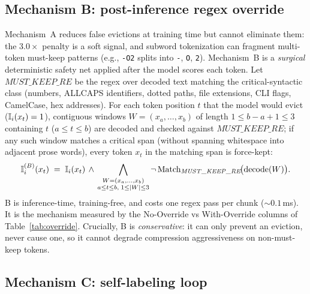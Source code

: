\subsection{Mechanism B: post-inference regex override}
\label{sec:override}

Mechanism~A reduces false evictions at training time but cannot eliminate
them: the $3.0\times$ penalty is a soft signal, and subword tokenization can
fragment multi-token must-keep patterns (e.g., \texttt{-O2} splits into
\texttt{-}, \texttt{O}, \texttt{2}). Mechanism~B is a \emph{surgical}
deterministic safety net applied after the model scores each token. Let
$\mathit{MUST\_KEEP\_RE}$ be the regex over decoded text matching the
critical-syntactic class (numbers, ALLCAPS identifiers, dotted paths, file
extensions, CLI flags, CamelCase, hex addresses). For each token position $t$
that the model would evict ($\mathbb{I}_i(x_t)=1$), contiguous windows
$W = (x_a,\dots,x_b)$ of length $1 \le b-a+1 \le 3$ containing $t$ ($a \le t \le b$)
are decoded and checked against $\mathit{MUST\_KEEP\_RE}$; if any such window
matches a critical span (without spanning whitespace into adjacent prose words),
every token $x_t$ in the matching span is force-kept:
\[
  \mathbb{I}^{(B)}_i(x_t)
  \;=\;
  \mathbb{I}_i(x_t)\,\wedge\,\bigwedge_{\substack{W=(x_a,\dots,x_b)\\ a\le t\le b,\; 1\le |W|\le 3}}
  \neg\,\mathrm{Match}_{\mathit{MUST\_KEEP\_RE}}\!\bigl(\mathrm{decode}(W)\bigr).
\]
B is inference-time, training-free, and costs one regex pass per chunk
(${\sim}0.1$\,ms). It is the mechanism measured by the No-Override vs
With-Override columns of Table~\ref{tab:override}. Crucially, B is
\emph{conservative}: it can only prevent an eviction, never cause one, so it
cannot degrade compression aggressiveness on non-must-keep tokens.

\subsection{Mechanism C: self-labeling loop}
\label{sec:selflabel}

